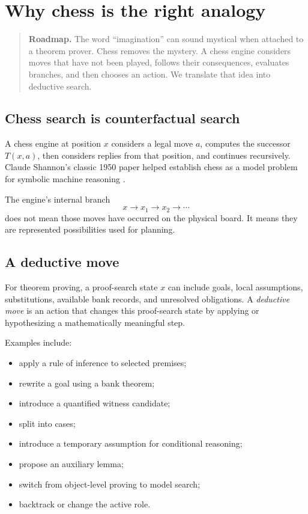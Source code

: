 \documentclass[11pt,openany]{book}
\theoremstyle{definition}
\theoremstyle{remark}
\newenvironment{roadmap}{\begin{quote}\small\color{deepblue}\textbf{Roadmap.} }{\end{quote}}
\begin{document}
\chapter{Why chess is the right analogy}
\begin{roadmap}
The word ``imagination'' can sound mystical when attached to a theorem prover. Chess removes the mystery. A chess engine considers moves that have not been played, follows their consequences, evaluates branches, and then chooses an action. We translate that idea into deductive search.
\end{roadmap}

\section{Chess search is counterfactual search}
A chess engine at position $x$ considers a legal move $a$, computes the successor $T(x,a)$, then considers replies from that position, and continues recursively. Claude Shannon's classic 1950 paper helped establish chess as a model problem for symbolic machine reasoning \cite{Shannon1950}.

The engine's internal branch
\[
x\to x_1\to x_2\to\cdots
\]
does not mean those moves have occurred on the physical board. It means they are represented possibilities used for planning.

\section{A deductive move}
For theorem proving, a proof-search state $x$ can include goals, local assumptions, substitutions, available bank records, and unresolved obligations. A \emph{deductive move} is an action that changes this proof-search state by applying or hypothesizing a mathematically meaningful step.

Examples include:
\begin{itemize}
\item apply a rule of inference to selected premises;
\item rewrite a goal using a bank theorem;
\item introduce a quantified witness candidate;
\item split into cases;
\item introduce a temporary assumption for conditional reasoning;
\item propose an auxiliary lemma;
\item switch from object-level proving to model search;
\item backtrack or change the active role.
\end{itemize}
\end{document}
